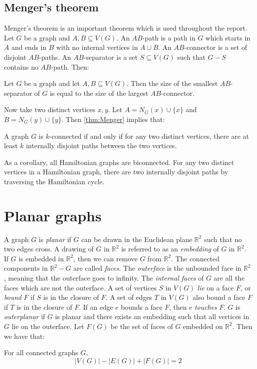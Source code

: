 \subsection{Menger's theorem}
Menger's theorem \cite{mengerZurAllgemeinenKurventheorie1927} is an important theorem which is used throughout the report.
Let \(G\) be a graph and \(A, B \subseteq V(G)\). An \(AB\)-path is a path in \(G\) which starts in \(A\) and ends in \(B\) with no internal vertices in \(A \cup B\). An \(AB\)-connector is a set of disjoint \(AB\)-paths. An \(AB\)-separator is a set \(S \subseteq V(G)\) such that \(G - S\) contains no \(AB\)-path. Then:
\begin{theorem}\label{thm:Menger}
	Let $G$ be a graph and let $A, B \subseteq V(G)$. Then the size of the smallest \(AB\)-separator of \(G\) is equal to the size of the largest \(AB\)-connector.
\end{theorem}
Now take two distinct vertices \(x, y\). Let \(A = N_G(x) \cup \{x\} \) and \(B = N_G(y) \cup \{y\} \). Then \cref{thm:Menger} implies that:
\begin{theorem}\label{thm:Menger_Vertex}
	A graph \(G\) is \(k\)-connected if and only if for any two distinct vertices, there are at least \(k\) internally disjoint paths between the two vertices.
\end{theorem}
As a corollary, all Hamiltonian graphs are biconnected. For any two distinct vertices in a Hamiltonian graph, there are two internally disjoint paths by traversing the Hamiltonian cycle.

\section{Planar graphs}\label{sec:Planar graphs}
A graph \(G\) is \textit{planar} if \(G\) can be drawn in the Euclidean plane \( \mathbb{R}^2 \) such that no two edges cross. A drawing of $G$ in $\mathbb{R}^2$ is referred to as an \textit{embedding} of $G$ in $\mathbb{R}^2$. If \(G\) is embedded in \(\mathbb{R}^2 \), then we can remove $G$ from $\mathbb{R}^2$. The connected components in $\mathbb{R}^2 - G$ are called \textit{faces}. The \textit{outerface} is the unbounded face in $\mathbb{R}^2$, meaning that the outerface goes to infinity. The \textit{internal faces} of $G$ are all the faces which are not the outerface. A set of vertices $S$ in $V(G)$ \textit{lie} on a face $F$, or \textit{bound} $F$ if $S$ is in the closure of $F$. A set of edges $T$ in $V(G)$ also bound a face $F$ if $T$ is in the closure of $F$. If an edge $e$ bounds a face $F$, then $e$ \textit{touches} $F$. \(G\) is \textit{outerplanar} if \(G\) is planar and there exists an embedding such that all vertices in \(G\) lie on the outerface.
Let \(F(G)\) be the set of faces of \(G\) embedded on \(\mathbb{R}^2\). Then we have that:
\begin{theorem}\label{thm:Euler_planar}
	For all connected graphs $G$,
	\begin{equation}
		|V(G)| - |E(G)| + |F(G)| = 2
	\end{equation}
\end{theorem}

